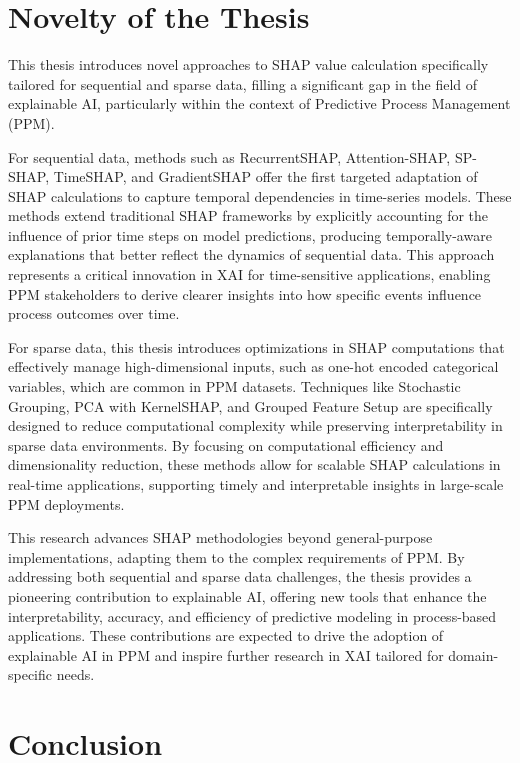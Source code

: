 \section{Novelty of the Thesis}

This thesis introduces novel approaches to SHAP value calculation specifically tailored for sequential and sparse data, filling a significant gap in the field of explainable AI, particularly within the context of Predictive Process Management (PPM).

For sequential data, methods such as RecurrentSHAP, Attention-SHAP, SP-SHAP, TimeSHAP, and GradientSHAP offer the first targeted adaptation of SHAP calculations to capture temporal dependencies in time-series models. These methods extend traditional SHAP frameworks by explicitly accounting for the influence of prior time steps on model predictions, producing temporally-aware explanations that better reflect the dynamics of sequential data. This approach represents a critical innovation in XAI for time-sensitive applications, enabling PPM stakeholders to derive clearer insights into how specific events influence process outcomes over time.

For sparse data, this thesis introduces optimizations in SHAP computations that effectively manage high-dimensional inputs, such as one-hot encoded categorical variables, which are common in PPM datasets. Techniques like Stochastic Grouping, PCA with KernelSHAP, and Grouped Feature Setup are specifically designed to reduce computational complexity while preserving interpretability in sparse data environments. By focusing on computational efficiency and dimensionality reduction, these methods allow for scalable SHAP calculations in real-time applications, supporting timely and interpretable insights in large-scale PPM deployments.

This research advances SHAP methodologies beyond general-purpose implementations, adapting them to the complex requirements of PPM. By addressing both sequential and sparse data challenges, the thesis provides a pioneering contribution to explainable AI, offering new tools that enhance the interpretability, accuracy, and efficiency of predictive modeling in process-based applications. These contributions are expected to drive the adoption of explainable AI in PPM and inspire further research in XAI tailored for domain-specific needs.

\section{Conclusion}

